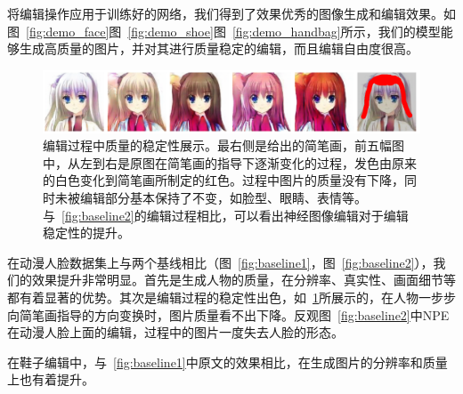 \documentclass[a4paper,12pt,UTF8]{ctexart}
\newcommand{\kai}{\CJKfamily{zhkai}}	%
\begin{document}
将编辑操作应用于训练好的网络，我们得到了效果优秀的图像生成和编辑效果。如图~\ref{fig:demo_face}图~\ref{fig:demo_shoe}图~\ref{fig:demo_handbag}所示，我们的模型能够生成高质量的图片，并对其进行质量稳定的编辑，而且编辑自由度很高。

\begin{figure}[H]
  \centering
  \includegraphics[width=1\linewidth]{figs/pic6.png}
  \caption{\kai 编辑过程中质量的稳定性展示。最右侧是给出的简笔画，前五幅图中，从左到右是原图在简笔画的指导下逐渐变化的过程，发色由原来的白色变化到简笔画所制定的红色。过程中图片的质量没有下降，同时未被编辑部分基本保持了不变，如脸型、眼睛、表情等。与~\ref{fig:baseline2}的编辑过程相比，可以看出神经图像编辑对于编辑稳定性的提升。}
  \label{fig:pic6}
\end{figure}

在动漫人脸数据集上与两个基线相比（图~\ref{fig:baseline1}，图~\ref{fig:baseline2}），我们的效果提升非常明显。首先是生成人物的质量，在分辨率、真实性、画面细节等都有着显著的优势。其次是编辑过程的稳定性出色，如~\ref{fig:pic6}所展示的，在人物一步步向简笔画指导的方向变换时，图片质量看不出下降。反观图~\ref{fig:baseline2}中NPE在动漫人脸上面的编辑，过程中的图片一度失去人脸的形态。

在鞋子编辑中，与~\ref{fig:baseline1}中原文的效果相比，在生成图片的分辨率和质量上也有着提升。




\end{document}
